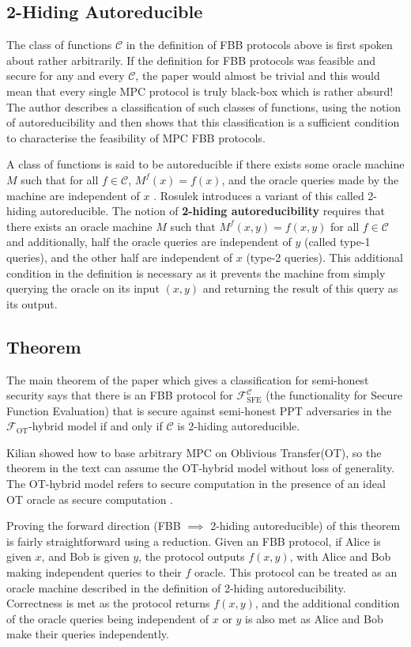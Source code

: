 \documentclass[11pt]{article}
\theoremstyle{theorem}
\theoremstyle{theorem}
\theoremstyle{remark}
\theoremstyle{note}
\theoremstyle{plain}
\theoremstyle{definition}
\begin{document}
\subsection{2-Hiding Autoreducible}
The class of functions $\mathcal{C}$ in the definition of FBB protocols above is first spoken about rather arbitrarily. If the definition for FBB protocols was feasible and secure for any and every  $\mathcal{C}$, the paper would almost be trivial and this would mean that every single MPC protocol is truly black-box which is rather absurd! The author describes a classification of such classes of functions, using the notion of autoreducibility and then shows that this classification is a sufficient condition to characterise the feasibility of MPC FBB protocols.

A class of functions is said to be autoreducible if there exists some oracle machine $M$ such that for all $f \in \mathcal{C}$, $M^{f}(x) = f(x)$, and the oracle queries made by the machine are independent of $x$ \cite{FOCS:BuhForTor95}. Rosulek introduces a variant of this called 2-hiding autoreducible. The notion of \textbf{2-hiding autoreducibility} requires that there exists an oracle machine $M$ such that $M^{f}(x,y) = f(x,y)$ for all $f \in \mathcal{C}$ and additionally, half the oracle queries are independent of $y$ (called type-1 queries), and the other half are independent of $x$ (type-2 queries). This additional condition in the definition is necessary as it prevents the machine from simply querying the oracle on its input $(x,y)$ and returning the result of this query as its output.

\subsection{Theorem}
The main theorem of the paper which gives a classification for semi-honest security says that there is an FBB protocol for $\mathcal{F}^\mathcal{C}_\text{SFE}$ (the functionality for Secure Function Evaluation) that is secure against semi-honest PPT adversaries in the $\mathcal{F}_\text{OT}$-hybrid model if and only if $\mathcal{C}$ is 2-hiding autoreducible.

 Kilian \cite{STOC:Kilian88} showed how to base arbitrary MPC on Oblivious Transfer(OT), so the theorem in the text can assume the OT-hybrid model without loss of generality. The OT-hybrid model refers to secure computation in the presence of an ideal OT oracle as secure computation \cite{C:IshPraSah08}.

Proving the forward direction (FBB $\implies$ 2-hiding autoreducible) of this theorem is fairly straightforward using a reduction. Given an FBB protocol, if Alice is given $x$, and Bob is given $y$, the protocol outputs $f(x,y)$, with Alice and Bob making independent queries to their $f$ oracle. This protocol can be treated as an oracle machine described in the definition of 2-hiding autoreducibility. Correctness is met as the protocol returns $f(x,y)$, and the additional condition of the oracle queries being independent of $x$ or $y$ is also met as Alice and Bob make their queries independently.
\end{document}
